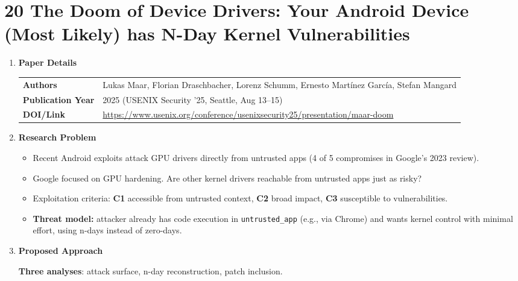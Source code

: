 \documentclass[11pt,a4paper]{article}
\newcommand{\entrypart}[1]{\textbf{\color{accent}#1}\par\vspace{2pt}}
\begin{document}
\newpage

\section{20 The Doom of Device Drivers: Your Android Device (Most Likely) has N-Day Kernel Vulnerabilities}

\begin{enumerate}

    \item \entrypart{Paper Details}

    \begin{tabular}{@{}>{\bfseries}p{3.2cm} p{11.5cm}@{}}
        Authors          & Lukas Maar, Florian Draschbacher, Lorenz Schumm, Ernesto Mart\'inez Garc\'ia, Stefan Mangard \\[2pt]
        Publication Year & 2025 (USENIX Security '25, Seattle, Aug 13--15) \\[2pt]
        DOI/Link         & \url{https://www.usenix.org/conference/usenixsecurity25/presentation/maar-doom}
    \end{tabular}

    \item \entrypart{Research Problem}

    \begin{itemize}
        \item Recent Android exploits attack GPU drivers directly from untrusted apps (4 of 5 compromises in Google's 2023 review).
        \item Google focused on GPU hardening. Are other kernel drivers reachable from untrusted apps just as risky?
        \item Exploitation criteria: \textbf{C1} accessible from untrusted context, \textbf{C2} broad impact, \textbf{C3} susceptible to vulnerabilities.
        \item \textbf{Threat model:} attacker already has code execution in \texttt{untrusted\_app} (e.g., via Chrome) and wants kernel control with minimal effort, using n-days instead of zero-days.
    \end{itemize}

    \item \entrypart{Proposed Approach}

    \textbf{Three analyses}: attack surface, n-day reconstruction, patch inclusion.


\end{enumerate}
\end{document}
